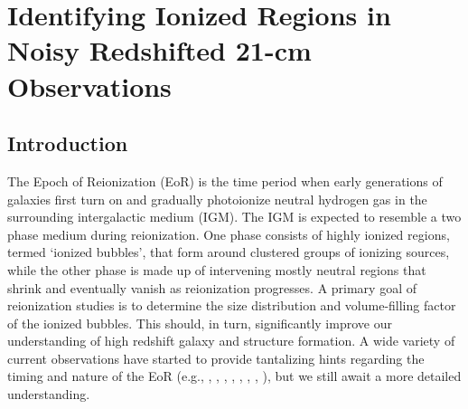 

\ifpdf
    \graphicspath{{bubble_finding/figures/PNG/}{bubble_finding/figures/PDF/}{bubble_finding/figures/}}
\else
    \graphicspath{{bubble_finding/figures/EPS/}{example_chapter/figures/}}
\fi



\chapter{Identifying Ionized Regions in Noisy Redshifted 21-cm Observations}

\section{Introduction} \label{sec:intro}
 
The Epoch of Reionization (EoR) is the time period when early generations
of galaxies first turn on and gradually photoionize neutral hydrogen
gas in the surrounding intergalactic medium (IGM). The IGM
is expected to resemble a two phase medium during reionization.
One phase consists of highly ionized regions, termed `ionized bubbles', that form around clustered
groups of ionizing sources, while the other phase is made up of intervening mostly neutral regions that
shrink and eventually vanish as reionization progresses. A primary goal
of reionization studies is to determine the size distribution and volume-filling factor of
the ionized bubbles. This should, in turn, significantly improve our understanding of high
redshift galaxy and structure formation. 
A wide variety of current
observations have started to provide tantalizing hints regarding the timing and nature of the EoR (e.g., \citealt{Fan:2005es}, \citealt{Totani:2005ng}, 
\citealt{Dunkley:2008ie}, \citealt{Ouchi:2010}, \citealt{Bouwens:2011xu}, \citealt{Mortlock:2011va}, \citealt{Zahn:2011vp}, \citealt{Schenker:2011ea}),
but we still await a more detailed understanding. 

